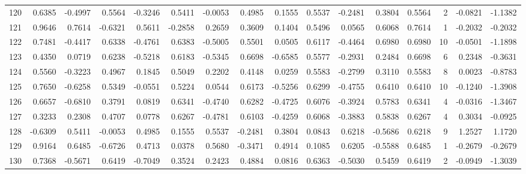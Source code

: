 \begin{tabular}{lrrrrrrrrrrrrrrr}
120 &      0.6385 & -0.4997 &  0.5564 & -0.3246 &  0.5411 & -0.0053 &  0.4985 &  0.1555 &  0.5537 & -0.2481 &   0.3804 &     0.5564 &      2 &                   -0.0821 &                    -1.1382 \\
121 &      0.9646 &  0.7614 & -0.6321 &  0.5611 & -0.2858 &  0.2659 &  0.3609 &  0.1404 &  0.5496 &  0.0565 &   0.6068 &     0.7614 &      1 &                   -0.2032 &                    -0.2032 \\
122 &      0.7481 & -0.4417 &  0.6338 & -0.4761 &  0.6383 & -0.5005 &  0.5501 &  0.0505 &  0.6117 & -0.4464 &   0.6980 &     0.6980 &     10 &                   -0.0501 &                    -1.1898 \\
123 &      0.4350 &  0.0719 &  0.6238 & -0.5218 &  0.6183 & -0.5345 &  0.6698 & -0.6585 &  0.5577 & -0.2931 &   0.2484 &     0.6698 &      6 &                    0.2348 &                    -0.3631 \\
124 &      0.5560 & -0.3223 &  0.4967 &  0.1845 &  0.5049 &  0.2202 &  0.4148 &  0.0259 &  0.5583 & -0.2799 &   0.3110 &     0.5583 &      8 &                    0.0023 &                    -0.8783 \\
125 &      0.7650 & -0.6258 &  0.5349 & -0.0551 &  0.5224 &  0.0544 &  0.6173 & -0.5256 &  0.6299 & -0.4755 &   0.6410 &     0.6410 &     10 &                   -0.1240 &                    -1.3908 \\
126 &      0.6657 & -0.6810 &  0.3791 &  0.0819 &  0.6341 & -0.4740 &  0.6282 & -0.4725 &  0.6076 & -0.3924 &   0.5783 &     0.6341 &      4 &                   -0.0316 &                    -1.3467 \\
127 &      0.3233 &  0.2308 &  0.4707 &  0.0778 &  0.6267 & -0.4781 &  0.6103 & -0.4259 &  0.6068 & -0.3883 &   0.5838 &     0.6267 &      4 &                    0.3034 &                    -0.0925 \\
128 &     -0.6309 &  0.5411 & -0.0053 &  0.4985 &  0.1555 &  0.5537 & -0.2481 &  0.3804 &  0.0843 &  0.6218 &  -0.5686 &     0.6218 &      9 &                    1.2527 &                     1.1720 \\
129 &      0.9164 &  0.6485 & -0.6726 &  0.4713 &  0.0378 &  0.5680 & -0.3471 &  0.4914 &  0.1085 &  0.6205 &  -0.5588 &     0.6485 &      1 &                   -0.2679 &                    -0.2679 \\
130 &      0.7368 & -0.5671 &  0.6419 & -0.7049 &  0.3524 &  0.2423 &  0.4884 &  0.0816 &  0.6363 & -0.5030 &   0.5459 &     0.6419 &      2 &                   -0.0949 &                    -1.3039 \\

\end{tabular}
